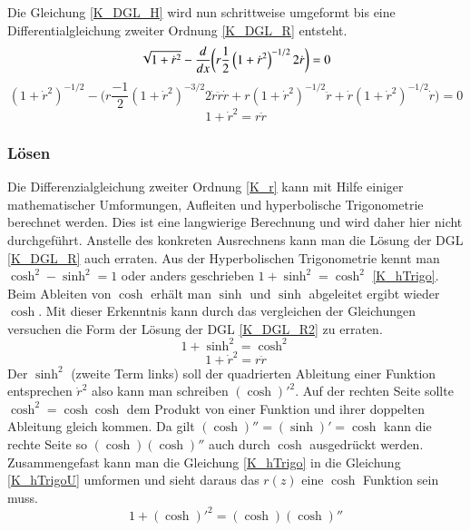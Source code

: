 \begin{refsection}
Die Gleichung \eqref{K_DGL_H} wird nun schrittweise umgeformt bis eine  Differentialgleichung zweiter Ordnung \eqref{K_DGL_R} entsteht.
\begin{equation} \label{K_DGL_H}
\sqrt{1+{\dot {r}}^2}-\frac{ d }{ dx } \bigg( r \frac{ 1 }{2  }\left( {1+{\dot {r}}^2}  \right)^{-1/2} 2 \dot {r}\bigg)=0
\\
\end{equation}
\begin{equation} \label{K_DGL_H2}
\left(1+{\dot {r}}^2  \right)^{-1/2}-\bigg(r \frac{ -1 }{2  } \left({1+{\dot {r}}^2}  \right)^{-3/2} 2 \dot{r} \ddot{r}  \dot{r}+ r \left({1+{\dot {r}}^2}  \right)^{-1/2} \ddot{r} +\dot{r} \left({1+{\dot {r}}^2}  \right)^{-1/2} \dot{r}\bigg)=0
\end{equation}
\begin{equation} \label{K_DGL_R}
1+{\dot {r}}^2=r  \ddot{r}
\end{equation}
\subsubsection{Lösen}
Die Differenzialgleichung zweiter Ordnung \eqref{K_r} kann mit Hilfe einiger mathematischer Umformungen, Aufleiten und hyperbolische Trigonometrie berechnet werden. 
Dies ist eine langwierige Berechnung und wird daher hier nicht durchgeführt.
Anstelle des konkreten Ausrechnens kann man die Lösung der DGL \eqref{K_DGL_R} auch erraten. 
Aus der Hyperbolischen Trigonometrie kennt man $\cosh^2-\sinh^2=1$ oder anders geschrieben $1+\sinh^2=\cosh^2$ \eqref{K_hTrigo}. Beim Ableiten von $\cosh$ erhält man $\sinh$ und $\sinh$ abgeleitet ergibt wieder $\cosh$. Mit dieser Erkenntnis kann durch das vergleichen der Gleichungen versuchen die Form der Lösung der DGL \eqref{K_DGL_R2} zu erraten. 
\begin{equation} \label{K_hTrigo}
1+\sinh^2=\cosh^2
\end{equation}
\begin{equation} \label{K_DGL_R2}
1+{\dot {r}}^2=r  \ddot{r}
\end{equation}
Der $\sinh^2$  (zweite Term links) soll der quadrierten Ableitung einer Funktion entsprechen ${\dot {r}}^2$ also kann man schreiben $(\cosh)'^2$. Auf der rechten Seite sollte $\cosh^2=\cosh \cosh$ dem Produkt von einer Funktion und ihrer doppelten Ableitung gleich kommen. Da gilt $(\cosh)''=(\sinh)'=\cosh$ kann die rechte Seite so $(\cosh) (\cosh)''$ auch durch $\cosh$ ausgedrückt werden. Zusammengefast kann man die Gleichung \eqref{K_hTrigo} in die Gleichung \eqref{K_hTrigoU} umformen und sieht daraus das $r(z)$ eine $\cosh$ Funktion sein muss.
\begin{equation} \label{K_hTrigoU}
1+(\cosh)'^2=(\cosh) (\cosh)''
\end{equation}


\end{refsection}
